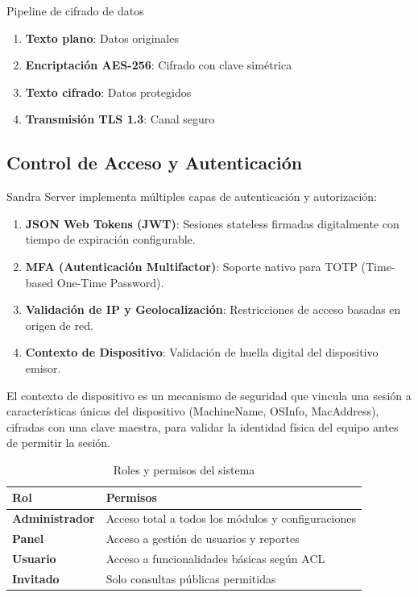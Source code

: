\begin{caja}{Pipeline de cifrado de datos}
\begin{enumerate}
\item \textbf{Texto plano}: Datos originales
\item \textbf{Encriptación AES-256}: Cifrado con clave simétrica
\item \textbf{Texto cifrado}: Datos protegidos
\item \textbf{Transmisión TLS 1.3}: Canal seguro
\end{enumerate}
\end{caja}

\subsection{Control de Acceso y Autenticación}

Sandra Server implementa múltiples capas de autenticación y autorización:

\begin{enumerate}
\item \textbf{JSON Web Tokens (JWT)}: Sesiones stateless firmadas digitalmente con tiempo de expiración configurable.
\item \textbf{MFA (Autenticación Multifactor)}: Soporte nativo para TOTP (Time-based One-Time Password).
\item \textbf{Validación de IP y Geolocalización}: Restricciones de acceso basadas en origen de red.
\item \textbf{Contexto de Dispositivo}: Validación de huella digital del dispositivo emisor.
\end{enumerate}

\begin{definicion}
El contexto de dispositivo es un mecanismo de seguridad que vincula una sesión a características únicas del dispositivo (MachineName, OSInfo, MacAddress), cifradas con una clave maestra, para validar la identidad física del equipo antes de permitir la sesión.
\end{definicion}

\begin{table}[H]
\centering
\caption{Roles y permisos del sistema}
\begin{tabular}{|l|p{8cm}|}
\hline
\textbf{Rol} & \textbf{Permisos} \\ \hline
\textbf{Administrador} & Acceso total a todos los módulos y configuraciones \\ \hline
\textbf{Panel} & Acceso a gestión de usuarios y reportes \\ \hline
\textbf{Usuario} & Acceso a funcionalidades básicas según ACL \\ \hline
\textbf{Invitado} & Solo consultas públicas permitidas \\ \hline
\end{tabular}
\end{table}

